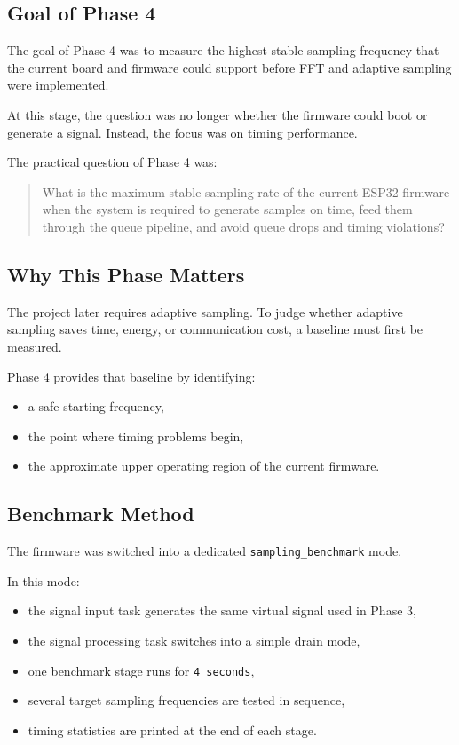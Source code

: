 \documentclass[12pt,a4paper]{article}
\begin{document}
\subsection{Goal of Phase 4}

The goal of Phase 4 was to measure the highest stable sampling frequency that
the current board and firmware could support before FFT and adaptive sampling
were implemented.

At this stage, the question was no longer whether the firmware could boot or
generate a signal. Instead, the focus was on timing performance.

The practical question of Phase 4 was:

\begin{quote}
What is the maximum stable sampling rate of the current ESP32 firmware when the
system is required to generate samples on time, feed them through the queue
pipeline, and avoid queue drops and timing violations?
\end{quote}

\subsection{Why This Phase Matters}

The project later requires adaptive sampling. To judge whether adaptive
sampling saves time, energy, or communication cost, a baseline must first be
measured.

Phase 4 provides that baseline by identifying:

\begin{itemize}
    \item a safe starting frequency,
    \item the point where timing problems begin,
    \item the approximate upper operating region of the current firmware.
\end{itemize}

\subsection{Benchmark Method}

The firmware was switched into a dedicated \texttt{sampling\_benchmark} mode.

In this mode:

\begin{itemize}
    \item the signal input task generates the same virtual signal used in Phase 3,
    \item the signal processing task switches into a simple drain mode,
    \item one benchmark stage runs for \texttt{4 seconds},
    \item several target sampling frequencies are tested in sequence,
    \item timing statistics are printed at the end of each stage.
\end{itemize}
\end{document}
